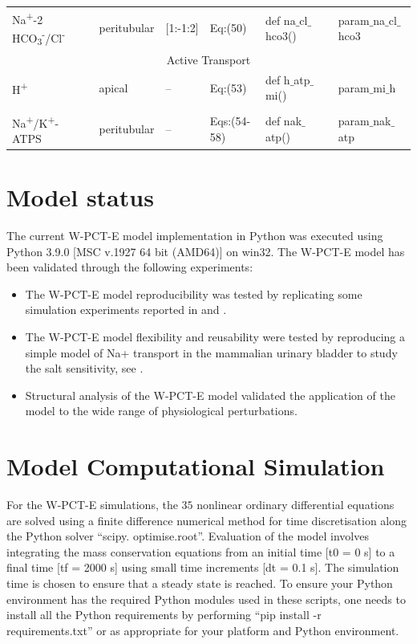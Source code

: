 \documentclass[fleqn,10pt]{physiome}
\begin{document}
\begin{table}[]
\begin{tabular}{p{2.2cm} p{1.6cm} p{1.8cm} p{1.8cm} p{2.7cm} p{2.8cm}}
Na\textsuperscript{+}-2 HCO\textsubscript{3}\textsuperscript{-}/Cl\textsuperscript{-}& peritubular&   [1:-1:2]& Eq:(50) & def na$\_$cl$\_$hco3()& param$\_$na$\_$cl$\_$hco3\\
\multicolumn{6}{c}{Active Transport}\\
H\textsuperscript{+}&   apical& -- & Eq:(53) & def h$\_$atp$\_$mi()& param$\_$mi$\_$h\\\\
Na\textsuperscript{+}/K\textsuperscript{+}-ATPS & peritubular&--& Eqs:(54-58)& def
nak$\_$atp()& param$\_$nak$\_$atp\\
\hline
\end{tabular}
 \label{Tab:components}
\end{table}

\section{Model status}
The current W-PCT-E model implementation in Python was executed using Python 3.9.0 [MSC v.1927 64 bit (AMD64)] on win32. The W-PCT-E model has been validated through the following experiments:
\begin{itemize}
   

 \item The W-PCT-E model reproducibility was tested by replicating some simulation experiments reported in \cite{Weinstein_1992} and \cite{Weinstein_2007}.

 \item The W-PCT-E model flexibility and reusability were tested by reproducing a simple model of Na+ transport in the mammalian urinary bladder to study the salt sensitivity, see \cite{latta_general_1984}.
\item Structural analysis of the W-PCT-E model validated the application of the model to the wide range of physiological perturbations.
\end{itemize}
\section{Model Computational Simulation}

For the W-PCT-E simulations, the $35$ nonlinear ordinary differential equations are solved using a finite difference numerical method for time discretisation along the Python solver ``scipy. optimise.root''. Evaluation of the model involves integrating the mass conservation equations from an initial time [t0 = 0 s] to a final time [tf = 2000 s] using small time increments [dt = 0.1 s]. The simulation time is chosen to ensure that a steady state is reached. To ensure your Python environment has the required Python modules used in these scripts, one needs to install all the Python requirements by performing ``pip install -r requirements.txt'' or as appropriate for your platform and Python environment.
\end{document}
